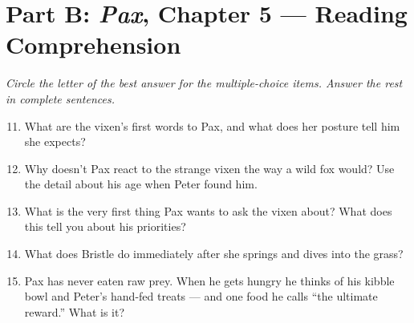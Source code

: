 \documentclass[11pt]{article}
\begin{document}
\section*{Part B: \textit{Pax}, Chapter 5 --- Reading Comprehension}
\noindent\textit{Circle the letter of the best answer for the multiple-choice items. Answer the rest in complete sentences.}
\begin{enumerate}\setcounter{enumi}{10}
  \item What are the vixen's first words to Pax, and what does her posture tell him she expects?
  \vspace{8pt}
  \item Why doesn't Pax react to the strange vixen the way a wild fox would? Use the detail about his age when Peter found him.
  \vspace{0.85in}
  \item What is the very first thing Pax wants to ask the vixen about? What does this tell you about his priorities?
  \vspace{0.85in}
  \item What does Bristle do immediately after she springs and dives into the grass?
  \vspace{8pt}
  \item Pax has never eaten raw prey. When he gets hungry he thinks of his kibble bowl and Peter's hand-fed treats --- and one food he calls ``the ultimate reward.'' What is it?
\end{enumerate}
\end{document}
